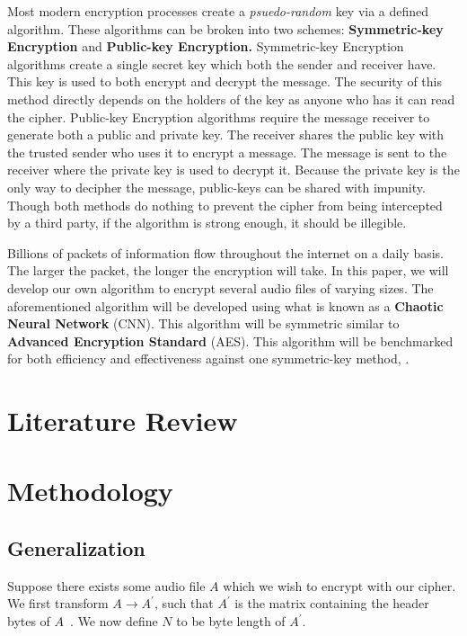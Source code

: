 \documentclass[conference]{IEEEtran}
\begin{document}
Most modern encryption processes create a \textit{psuedo-random} key via a defined algorithm.
These algorithms can be broken into two schemes: \textbf{Symmetric-key Encryption} and \textbf{Public-key Encryption.}
Symmetric-key Encryption algorithms create a single secret key which both the sender and receiver have.
This key is used to both encrypt and decrypt the message.
The security of this method directly depends on the holders of the key as anyone who has it can read the cipher.
Public-key Encryption algorithms require the message receiver to generate both a public and private key.
The receiver shares the public key with the trusted sender who uses it to encrypt a message.
The message is sent to the receiver where the private key is used to decrypt it.
Because the private key is the only way to decipher the message, public-keys can be shared with impunity.
Though both methods do nothing to prevent the cipher from being intercepted by a third party, if the algorithm is strong enough, it should be illegible.

Billions of packets of information flow throughout the internet on a daily basis.
The larger the packet, the longer the encryption will take.
In this paper, we will develop our own algorithm to encrypt several audio files of varying sizes.
The aforementioned algorithm will be developed using what is known as a \textbf{Chaotic Neural Network} (CNN).
This algorithm will be symmetric similar to \textbf{Advanced Encryption Standard} (AES).
This algorithm will be benchmarked for both efficiency and effectiveness against one symmetric-key method, .

\section{Literature Review}\label{sec:literature-review}


\section{Methodology}\label{sec:methodology}

\subsection{Generalization}\label{subsec:generalization}

Suppose there exists some audio file $A$ which we wish to encrypt with our cipher\@.
We first transform $A \rightarrow A^\prime$, such that $A^\prime$ is the matrix containing the header bytes of $A$~\cite{app112110190}.
We now define $N$ to be byte length of $A^\prime$.
\end{document}
